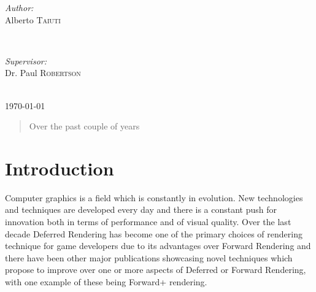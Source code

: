 \begin{titlepage}

\begin{minipage}{0.4\textwidth}
\begin{flushleft} \large
\emph{Author:}\\
Alberto \textsc{Taiuti} %
\end{flushleft}
\end{minipage}
~
\begin{minipage}{0.4\textwidth}
\begin{flushright} \large
\emph{Supervisor:} \\
Dr. Paul \textsc{Robertson} %
\end{flushright}
\end{minipage}\\[2cm]



{\large \today}\\[2cm] %



\vfill %

\end{titlepage}


%
%
%


\begin{abstract}
Over the past couple of years
\end{abstract}

\section{Introduction}
Computer graphics is a field which is constantly in evolution. New technologies
and techniques are developed every day and there is a constant push for
innovation both in terms of performance and of visual quality.
Over the last decade Deferred Rendering has become one of the primary choices of
rendering technique for game developers due to its advantages over Forward
Rendering and there have been other major publications showcasing novel
techniques which propose to improve over one or more aspects of Deferred or
Forward Rendering, with one example of these being Forward+ rendering.\\

